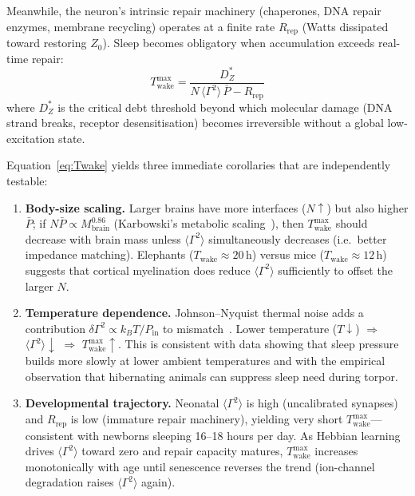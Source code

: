 ﻿\documentclass[aps,pre,twocolumn,superscriptaddress,floatfix]{revtex4-2}
\begin{document}
Meanwhile, the neuron's intrinsic repair machinery
(chaperones, DNA repair enzymes, membrane recycling)
operates at a finite rate $R_{\mathrm{rep}}$
(Watts dissipated toward restoring $Z_0$).
Sleep becomes obligatory when accumulation exceeds
real-time repair:
\begin{equation}
  \boxed{T_{\mathrm{wake}}^{\max}
    = \frac{D_Z^*}{N\,\langle\Gamma^2\rangle\,\bar{P}
      - R_{\mathrm{rep}}}}
  \label{eq:Twake}
\end{equation}
where $D_Z^*$ is the critical debt threshold beyond which
molecular damage (DNA strand breaks, receptor desensitisation)
becomes irreversible without a global low-excitation state.

Equation~\eqref{eq:Twake} yields three immediate corollaries
that are independently testable:

\begin{enumerate}
  \item \textbf{Body-size scaling.}
    Larger brains have more interfaces ($N \uparrow$)
    but also higher $\bar{P}$; if
    $N\bar{P}\propto M_{\mathrm{brain}}^{0.86}$
    (Karbowski's metabolic scaling~\cite{Karbowski2009,Karbowski2014}),
    then $T_{\mathrm{wake}}^{\max}$ should decrease
    with brain mass unless $\langle\Gamma^2\rangle$
    simultaneously decreases (i.e.\ better impedance matching).
    Elephants ($T_{\mathrm{wake}}\approx 20$\,h) versus
    mice ($T_{\mathrm{wake}}\approx 12$\,h) suggests
    that cortical myelination does reduce
    $\langle\Gamma^2\rangle$ sufficiently to offset the
    larger $N$.
  \item \textbf{Temperature dependence.}
    Johnson--Nyquist thermal noise adds a contribution
    $\delta\Gamma^2 \propto k_B T / P_{\mathrm{in}}$
    to mismatch~\cite{PaperI}.
    Lower temperature ($T\downarrow$) $\Rightarrow$
    $\langle\Gamma^2\rangle\downarrow$ $\Rightarrow$
    $T_{\mathrm{wake}}^{\max}\uparrow$.
    This is consistent with data showing that sleep pressure
    builds more slowly at lower ambient temperatures
    and with the empirical observation that hibernating
    animals can suppress sleep need during torpor.
  \item \textbf{Developmental trajectory.}
    Neonatal $\langle\Gamma^2\rangle$ is high
    (uncalibrated synapses) and $R_{\mathrm{rep}}$ is low
    (immature repair machinery), yielding very short
    $T_{\mathrm{wake}}^{\max}$---consistent with
    newborns sleeping 16--18 hours per day.
    As Hebbian learning drives $\langle\Gamma^2\rangle$
    toward zero and repair capacity matures,
    $T_{\mathrm{wake}}^{\max}$ increases monotonically
    with age until senescence reverses the trend
    (ion-channel degradation raises
    $\langle\Gamma^2\rangle$ again).
\end{enumerate}
\end{document}
